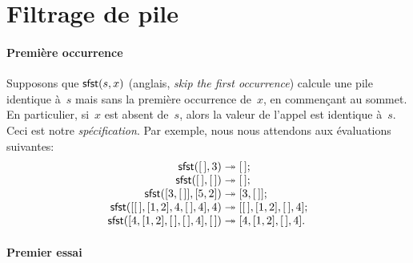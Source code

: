 \section{Filtrage de pile}
\label{sec:skipping}

\paragraph{Première occurrence}
\label{def:linear_search}

Supposons que \(\textsf{sfst}(s,x)\) (anglais,
\emph{skip the first occurrence}) calcule une pile identique à~\(s\)
mais sans la première occurrence de~\(x\), en commençant au sommet. En
particulier, si~\(x\) est absent de~\(s\), alors la valeur de l'appel
est identique à~\(s\). Ceci est notre
\emph{spécification}. Par exemple, nous nous
attendons aux évaluations suivantes:\label{sfst_ex}
\begin{equation*}
\begin{array}{r@{\;}l@{\;}l}
\fun{sfst}(\el,3) & \twoheadrightarrow & \el;\\
\fun{sfst}(\el,\el) & \twoheadrightarrow & \el;\\
\fun{sfst}([3,\el],[5,2]) & \twoheadrightarrow & [3,\el];\\
\fun{sfst}([\el,[1,2],4,\el,4],4) & \twoheadrightarrow &
  [\el,[1,2],\el,4];\\
\fun{sfst}([4,[1,2],\el,\el,4],\el)
 & \twoheadrightarrow & [4,[1,2],\el,4].
\end{array}
\end{equation*}

\paragraph{Premier essai}

